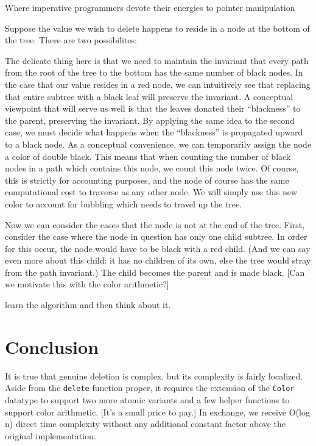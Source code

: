 \documentclass[preprint]{sigplanconf}
\begin{document}
Where imperative programmers devote their energies to pointer manipulation








Suppose the value we wish to delete happens to reside in a node at the bottom of the tree. There are two possibilites:


The delicate thing here is that we need to maintain the invariant that every path from the root of the tree to the bottom has the same number of black nodes. In the case that our value resides in a red node, we can intuitively see that replacing that entire subtree with a black leaf will preserve the invariant. A conceptual viewpoint that will serve us well is that the leaves donated their ``blackness'' to the parent, preserving the invariant. By applying the same idea to the second case, we must decide what happens when the ``blackness'' is propagated upward to a black node. As a conceptual convenience, we can temporarily assign the node a color of double black. This means that when counting the number of black nodes in a path which contains this node, we count this node twice. Of course, this is strictly for accounting purposes, and the node of course has the same computational cost to traverse as any other node. We will simply use this new color to account for bubbling which needs to travel up the tree.

Now we can consider the cases that the node is not at the end of the tree. First, consider the case where the node in question has only one child subtree. In order for this occur, the node would have to be black with a red child. (And we can say even more about this child: it has no children of its own, else the tree would stray from the path invariant.) The child becomes the parent and is made black. [Can we motivate this with the color arithmetic?]

learn the algorithm and then think about it.

\section{Conclusion}
It is true that genuine deletion is complex, but its complexity is fairly localized. Aside from the \texttt{delete} function proper, it requires the extension of the \texttt{Color} datatype to support two more atomic variants and a few helper functions to support color arithmetic. [It's a small price to pay.] In exchange, we receive O(log n) direct time complexity without any additional constant factor above the original implementation.
\end{document}
